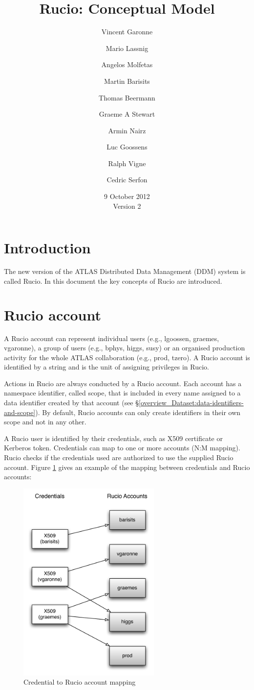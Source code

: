 \documentclass{atlasnote}
\title{Rucio: Conceptual Model}
\author[1]{Vincent Garonne}
\author[1]{Mario Lassnig}
\author[1]{Angelos Molfetas}
\author[1]{Martin Barisits}
\author[1]{Thomas Beermann}
\author[1]{Graeme A Stewart}
\author[1]{Armin Nairz}
\author[1]{Luc Goossens}
\author[1]{Ralph Vigne}
\author[1]{Cedric Serfon}
\affil[1]{PH-ADP-CO, CERN}
\date{9 October 2012\\ Version 2}
\begin{document}
\section{Introduction}

The new version of the ATLAS Distributed Data Management (DDM) system is called Rucio. In this document the key concepts of Rucio are introduced.

\section{Rucio account}
\label{overview_Rucio_account:rucio-account}

A Rucio account can represent individual users (e.g., lgoossen, graemes, vgaronne), a group of users (e.g., bphys, higgs, susy) or an organised production activity for the whole ATLAS collaboration (e.g., prod, tzero). A Rucio account is identified by a string and is the unit of assigning privileges in Rucio.

Actions in Rucio are always conducted by a Rucio account. Each account has a namespace identifier, called scope, that is included in every name assigned to a data identifier created by that account (see \S \ref{overview_Dataset:data-identifiers-and-scope}). By default, Rucio accounts can only create identifiers in their own scope and not in any other.

A Rucio user is identified by their credentials, such as X509 certificate or Kerberos token. Credentials can map to one or more accounts (N:M mapping). Rucio checks if the credentials used are authorized to use the supplied Rucio account. Figure \ref{credentials} gives an example of the mapping between credentials and Rucio accounts:

\begin{figure}[ht]
\begin{center}
\includegraphics[width=200pt]{accounts}
\end{center}
\caption{\label{credentials} Credential to Rucio account mapping}
\end{figure}
\end{document}
